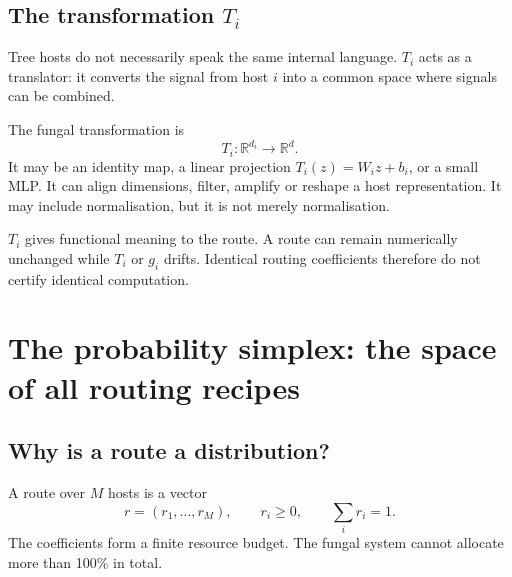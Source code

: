 \documentclass[11pt,a4paper]{article}
\begin{document}
\subsection{The transformation $T_i$}

\begin{twelvebox}
Tree hosts do not necessarily speak the same internal language. $T_i$ acts as a translator: it converts the signal from host $i$ into a common space where signals can be combined.
\end{twelvebox}

\begin{engineerbox}
The fungal transformation is
\[
T_i:\mathbb{R}^{d_i}\rightarrow\mathbb{R}^{d}.
\]
It may be an identity map, a linear projection $T_i(z)=W_i z+b_i$, or a small MLP. It can align dimensions, filter, amplify or reshape a host representation. It may include normalisation, but it is not merely normalisation.
\end{engineerbox}

\begin{researchbox}
$T_i$ gives functional meaning to the route. A route can remain numerically unchanged while $T_i$ or $g_i$ drifts. Identical routing coefficients therefore do not certify identical computation.
\end{researchbox}

\newpage
\section{The probability simplex: the space of all routing recipes}

\subsection{Why is a route a distribution?}

A route over $M$ hosts is a vector
\[
r=(r_1,\ldots,r_M), \qquad r_i\geq0, \qquad \sum_i r_i=1.
\]
The coefficients form a finite resource budget. The fungal system cannot allocate more than 100\% in total.
\end{document}
